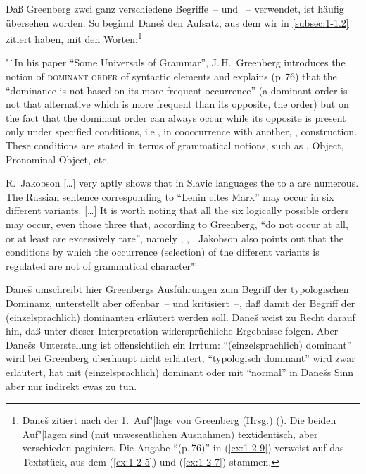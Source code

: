 \documentclass[output=paper]{langsci/langscibook}
\begin{document}
Daß Greenberg zwei ganz verschiedene Begriffe~– 
und ~– verwendet, ist häufig übersehen worden. So beginnt
Dane\v{s} den Aufsatz, aus dem wir in \ref{subsec:1-1.2} zitiert haben, mit den Worten:\footnote{%
  Dane\v{s} zitiert nach der 1.~Auf"|lage von Greenberg (Hrsg.) (\citeyear{Universalsoflanguage}). Die
  beiden Auf"|lagen sind (mit unwesentlichen Ausnahmen) textidentisch, aber verschieden paginiert. Die
  Angabe "`(p.\,76)"' in (\ref{ex:1-2-9}) verweist auf das Textstück, aus dem (\ref{ex:1-2-5}) und
  (\ref{ex:1-2-7}) stammen.%
}
\begin{exe}
\ex\label{ex:1-2-9}
"`In his paper ``Some Universals of Grammar'', J.\,H.\ Greenberg introduces
the notion of \textsc{dominant order} of syntactic elements and explains (p.\,76) that the ``dominance is not based on its more frequent occurrence'' (a dominant order is not that alternative which is more frequent than its opposite,
the  order) but on the fact that the dominant order can always occur while its opposite is present only under specified conditions, i.e., in cooccurrence with another, , construction. These conditions are
stated in terms of grammatical notions, such as , Object, Pronominal
Object, etc.

\hspace{1em} R.\ Jakobson [\ldots] very aptly shows that in Slavic languages the
 to a  are
numerous. The Russian sentence corresponding to ``Lenin cites Marx'' may
occur in six different variants. [\ldots] It is worth noting that all the
six logically possible orders may occur, even those three that,
according to Greenberg, ``do not occur at all, or at least are
excessively rare'', namely , , . Jakobson also points out that
the conditions by which the occurrence (selection) of the different
variants is regulated are not of grammatical character"' \citep[499]{Danes1967}
\end{exe}
Dane\v{s} umschreibt hier Greenbergs Ausführungen zum Begriff der
typologischen Dominanz, unterstellt aber offenbar~-- und kritisiert~–,
daß damit der Begriff der (einzelsprachlich) dominanten 
erläutert werden soll. Dane\v{s} weist zu Recht darauf hin, daß unter
dieser Interpretation widersprüchliche Ergebnisse folgen. Aber
Dane\v{s}s Unterstellung ist offensichtlich ein Irrtum:
"`(einzelsprachlich) dominant"' wird bei Greenberg überhaupt nicht
erläutert; "`typologisch dominant"' wird zwar erläutert, hat mit
(einzelsprachlich) dominant oder mit "`normal"' in Dane\v{s}s Sinn aber
nur indirekt ewas zu tun.
\end{document}
